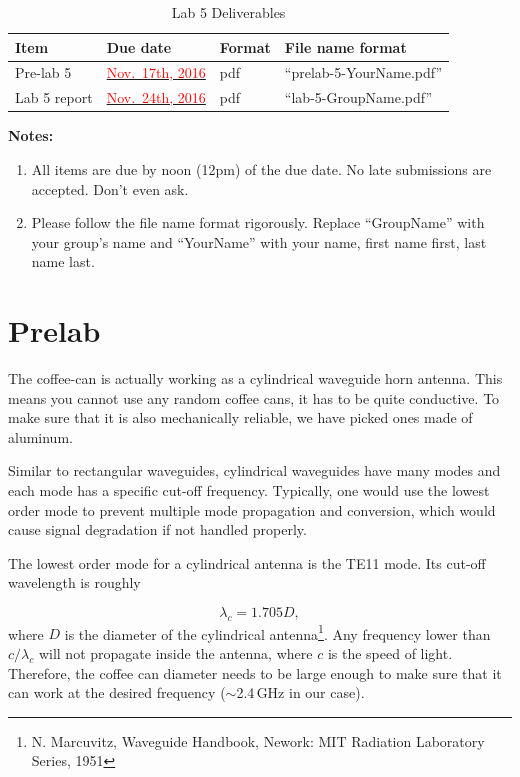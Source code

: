 \documentclass[letterpaper, 11pt]{article}
\newcommand{\due}[1]{\href{https://github.com/ucdart/UCD-EEC134/blob/master/support/schedule/eec134-schedule.pdf}{\textcolor{red}{#1}}}
\begin{document}

\begin{table}[h]
	\footnotesize
	\caption{Lab 5 Deliverables}
	\renewcommand{\arraystretch}{1.2}
	\begin{tabular}{|m{1in}|l|m{0.45in}|m{2in}|}
		\hline
		\textbf{Item} & \textbf{Due date} & \textbf{Format} & \textbf{File name format} \\
		\hline
		\hline
		Pre-lab 5 & \due{Nov.~17th, 2016} & pdf & ``prelab-5-YourName.pdf''\\
				
		\hline
		Lab 5 report & \due{Nov.~24th, 2016} & pdf & ``lab-5-GroupName.pdf''\\
		\hline
	\end{tabular}
	\label{tab:deliverables}
\end{table}

\textbf{Notes:}
\begin{enumerate}
	\item All items are due by noon (12pm) of the due date. No late submissions are accepted. Don't even ask. 
	
	\item Please follow the file name format rigorously. Replace ``GroupName'' with your group's name and ``YourName'' with your name, first name first, last name last. 
\end{enumerate}


\section{Prelab}

The coffee-can is actually working as a cylindrical waveguide horn antenna. This means you cannot use any random coffee cans, it has to be quite conductive. To make sure that it is also mechanically reliable, we have picked ones made of aluminum. 

Similar to rectangular waveguides, cylindrical waveguides have many modes and each mode has a specific cut-off frequency. Typically, one would use the lowest order mode to prevent multiple mode propagation and conversion, which would cause signal degradation if not handled properly. 

The lowest order mode for a cylindrical antenna is the TE11 mode. Its cut-off wavelength is roughly 

\[
\lambda_c = 1.705 D,
\]
where $D$ is the diameter of the cylindrical antenna\footnote{N. Marcuvitz, Waveguide Handbook, Nework: MIT Radiation Laboratory Series, 1951}. Any frequency lower than $c/\lambda_c$ will not propagate inside the antenna, where $c$ is the speed of light. Therefore, the coffee can diameter needs to be large enough to make sure that it can work at the desired frequency ($\sim$2.4\,GHz in our case). 
\end{document}
